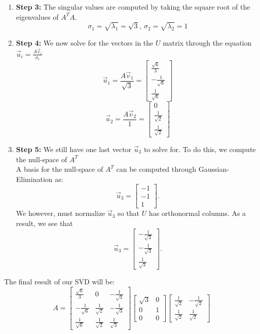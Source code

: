 \begin{enumerate}
{\begin{enumerate}[label=(\roman*)]
        Remember to normalize these vectors since they form the $V$ matrix.
      \item \textbf{Step 3:}
        The singular values are computed by taking the square root of the eigenvalues of $A^{T}A.$
        $$\sigma_{1} = \sqrt{\lambda_{1}} = \sqrt{3}, \ \sigma_{2} = \sqrt{\lambda_{2}} = 1$$
      \item \textbf{Step 4:}
        We now solve for the vectors in the $U$ matrix through the equation $\vec{u}_i = \frac{A \vec{v}_i}{\sigma_i}$
        $$\vec{u}_{1} = \frac{A \vec{v}_{1}}{\sqrt{3}} =
        \begin{bmatrix} \frac{\sqrt{6}}{3} \\ -\frac{1}{\sqrt{6}} \\ \frac{1}{\sqrt{6}} \end{bmatrix}$$
        $$\vec{u}_{2} = \frac{A \vec{v}_{2}}{1} =
        \begin{bmatrix} 0 \\ \frac{1}{\sqrt{2}} \\ \frac{1}{\sqrt{2}} \end{bmatrix}$$
      \item \textbf{Step 5:}
        We still have one last vector $\vec{u}_{3}$ to solve for. To do this, we compute the null-space of $A^{T}$ \\
        A basis for the null-space of $A^{T}$ can be computed through Gaussian-Elimination as:
        $$\vec{u}_{3} = \begin{bmatrix} -1 \\ -1 \\ 1 \end{bmatrix}.$$
        We however, must normalize $\vec{u}_{3}$ so that $U$ has orthonormal columns. As a result, we see that
        $$\vec{u}_{3} = \begin{bmatrix} -\frac{1}{\sqrt{3}} \\ - \frac{1}{\sqrt{3}} \\ \frac{1}{\sqrt{3}} \end{bmatrix}.$$
    \end{enumerate}
    The final result of our SVD will be:
    \begin{equation}
      A = \begin{bmatrix} \frac{\sqrt{6}}{3} & 0 & -\frac{1}{\sqrt{3}} \\
      -\frac{1}{\sqrt{6}} & \frac{1}{\sqrt{2}} & -\frac{1}{\sqrt{3}} \\
      \frac{1}{\sqrt{6}} & \frac{1}{\sqrt{2}} & \frac{1}{\sqrt{3}} \end{bmatrix}
      \begin{bmatrix} \sqrt{3} & 0  \\ 0 & 1 \\ 0 & 0 \end{bmatrix}
      \begin{bmatrix} \frac{1}{\sqrt{2}} & -\frac{1}{\sqrt{2}} \\ \frac{1}{\sqrt{2}} & \frac{1}{\sqrt{2}} \end{bmatrix}
    \end{equation}
  }
\end{enumerate}

